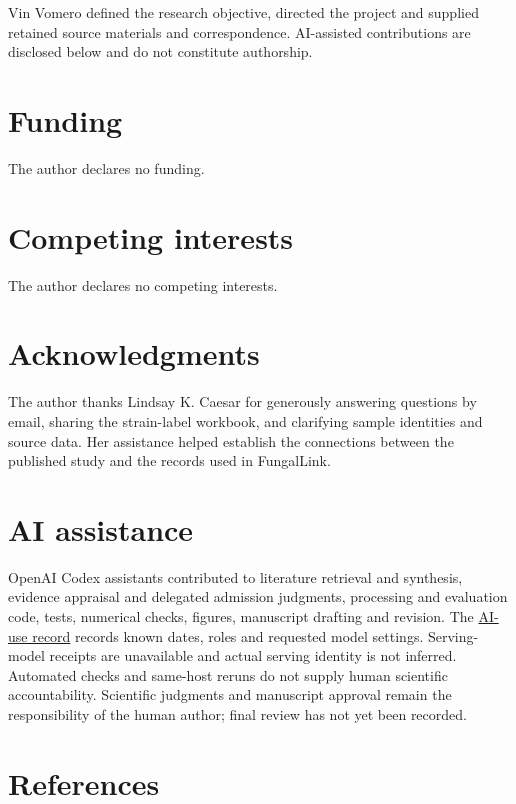 \documentclass[
  10pt,
  a4paper,
]{article}
\begin{document}
Vin Vomero defined the research objective, directed the project and supplied retained source materials and correspondence. AI-assisted contributions are disclosed below and do not constitute authorship.

\section{Funding}\label{funding}

The author declares no funding.

\section{Competing interests}\label{competing-interests}

The author declares no competing interests.

\section{Acknowledgments}\label{acknowledgments}

The author thanks Lindsay K. Caesar for generously answering questions by email, sharing the strain-label workbook, and clarifying sample identities and source data. Her assistance helped establish the connections between the published study and the records used in FungalLink.

\section{AI assistance}\label{ai-assistance}

OpenAI Codex assistants contributed to literature retrieval and synthesis, evidence appraisal and delegated admission judgments, processing and evaluation code, tests, numerical checks, figures, manuscript drafting and revision. The \href{https://github.com/vinvomero/fungallink-benchmark/blob/main/manuscript/ai-use-record-v1.md}{AI-use record} records known dates, roles and requested model settings. Serving-model receipts are unavailable and actual serving identity is not inferred. Automated checks and same-host reruns do not supply human scientific accountability. Scientific judgments and manuscript approval remain the responsibility of the human author; final review has not yet been recorded.

\FloatBarrier

\section{References}\label{references}
\end{document}
